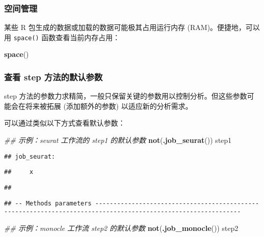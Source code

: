 \documentclass[
]{article}
\newenvironment{Shaded}{\begin{snugshade}}{\end{snugshade}}
\newcommand{\CommentTok}[1]{\textcolor[rgb]{0.56,0.35,0.01}{\textit{#1}}}
\newcommand{\KeywordTok}[1]{\textcolor[rgb]{0.13,0.29,0.53}{\textbf{#1}}}
\newcommand{\NormalTok}[1]{#1}
\begin{document}
\hypertarget{ux7a7aux95f4ux7ba1ux7406}{%
\subsubsection{空间管理}\label{ux7a7aux95f4ux7ba1ux7406}}

某些 R 包生成的数据或加载的数据可能极其占用运行内存 (RAM)。便捷地，可以用 \texttt{space()} 函数查看当前内存占用：

\begin{Shaded}
\begin{Highlighting}[]
\KeywordTok{space}\NormalTok{()}
\end{Highlighting}
\end{Shaded}

\hypertarget{params}{%
\subsubsection{查看 step 方法的默认参数}\label{params}}

step 方法的参数力求精简，一般只保留关键的参数用以控制分析。但这些参数可能会在将来被拓展 (添加额外的参数) 以适应新的分析需求。

可以通过类似以下方式查看默认参数：

\begin{Shaded}
\begin{Highlighting}[]
\CommentTok{\#\# 示例：seurat 工作流的 step1 的默认参数}
\KeywordTok{not}\NormalTok{(}\KeywordTok{.job\_seurat}\NormalTok{())}
\NormalTok{step1}
\end{Highlighting}
\end{Shaded}

\begin{verbatim}
## job_seurat:
\end{verbatim}

\begin{verbatim}
##     x
\end{verbatim}

\begin{verbatim}
## 
\end{verbatim}

\begin{verbatim}
## -- Methods parameters --------------------------------------------------------------------------------------------------------------
\end{verbatim}

\begin{Shaded}
\begin{Highlighting}[]
\CommentTok{\#\# 示例：monocle 工作流 step2 的默认参数}
\KeywordTok{not}\NormalTok{(}\KeywordTok{.job\_monocle}\NormalTok{())}
\NormalTok{step2}
\end{Highlighting}
\end{Shaded}
\end{document}
